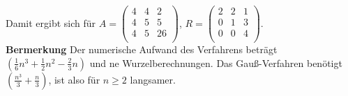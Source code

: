 \documentclass{scrartcl}
\begin{document}
Damit ergibt sich für $A=\begin{pmatrix}
4 & 4 & 2 \\
4 & 5 & 5 \\
4 & 5 & 26 \\
\end{pmatrix}$, $R=\begin{pmatrix}
2 & 2 & 1 \\
0 & 1 & 3 \\
0 & 0 & 4 \\
\end{pmatrix}$.\\
\textbf{Bermerkung} Der numerische Aufwand des Verfahrens beträgt $(\frac{1}{6} n^3 + \frac{1}{2} n^2 -\frac{2}{3} n)$ und ne Wurzelberechnungen.
Das Gauß-Verfahren benötigt$(\frac{n^3}{3}+\frac{n}{3})$, ist also für $n \geq 2 $ langsamer.
\end{document}
